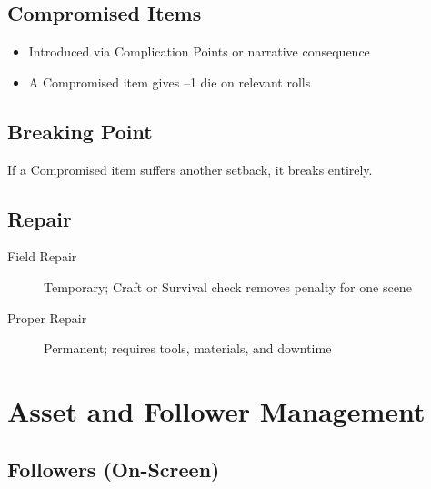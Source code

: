 \subsection{Compromised Items}

\begin{itemize}
\item Introduced via Complication Points or narrative consequence
\item A Compromised item gives --1 die on relevant rolls
\end{itemize}

\subsection{Breaking Point}
If a Compromised item suffers another setback, it breaks entirely.

\subsection{Repair}

\begin{description}
\item[Field Repair] Temporary; Craft or Survival check removes penalty for one scene
\item[Proper Repair] Permanent; requires tools, materials, and downtime
\end{description}

\section{Asset and Follower Management}

\subsection{Followers (On-Screen)}

